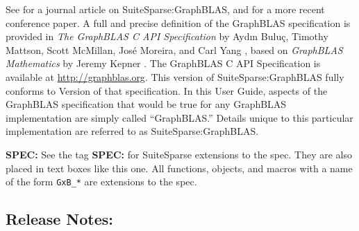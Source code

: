 \documentclass[12pt]{article}
\begin{document}

See \cite{Davis18} for a journal article on SuiteSparse:GraphBLAS, and
\cite{Davis18b} for a more recent conference paper.  A full and precise
definition of the GraphBLAS specification is provided in {\em The GraphBLAS C
API Specification} by {Ayd\i n Bulu\c{c}, Timothy Mattson, Scott McMillan,
Jos\'e Moreira, and Carl Yang} \cite{BulucMattsonMcMillanMoreiraYang17,spec},
based on {\em GraphBLAS Mathematics} by Jeremy Kepner \cite{Kepner2017}.  The
GraphBLAS C API Specification is available at \url{http://graphblas.org}.  This
version of SuiteSparse:GraphBLAS fully conforms to Version
 of that specification.  In this User Guide,
aspects of the GraphBLAS specification that would be true for any GraphBLAS
implementation are simply called ``GraphBLAS.'' Details unique to this
particular implementation are referred to as SuiteSparse:GraphBLAS.

\begin{spec}
{\bf SPEC:} See the tag {\bf SPEC:} for SuiteSparse extensions to the spec.
They are also placed in text boxes like this one.  All functions, objects, and
macros with a name of the form \verb'GxB_*' are extensions to the spec.
\end{spec}

\newpage
\subsection{Release Notes:}
\end{document}
